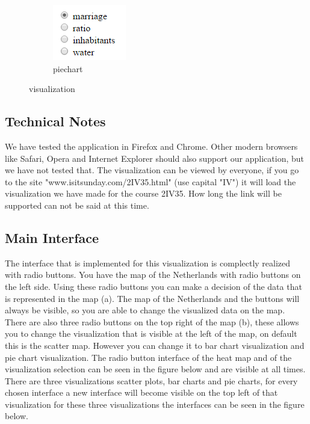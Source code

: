 \documentclass[a4paper,twoside,11pt]{article}
\begin{document}
\begin{figure}
\begin{subfigure}[h]{0.12\textwidth}
                \includegraphics[width=\textwidth]{Interface/PieInterface.png}
                \caption{piechart}
        \end{subfigure}
        \caption{visualization}
\end{figure}
\subsection{Technical Notes}
We have tested the application in Firefox and Chrome. Other modern browsers like Safari, Opera and Internet Explorer should also support our application, but we have not tested that. \newline
The visualization can be viewed by everyone, if you go to the site "www.isitsunday.com/2IV35.html" (use capital "IV") it will load the visualization we have made for the course 2IV35. How long the link will be supported can not be said at this time. \newline
\subsection{Main Interface}
The interface that is implemented for this visualization is complectly realized with radio buttons. You have the map of the Netherlands with radio buttons on the left side. Using these radio buttons you can make a decision of the data that is represented in the map (a). The map of the Netherlands and the buttons will always be visible, so you are able to change the visualized data on the map. There are also three radio buttons on the top right of the map (b), these allows you to change the visualization that is visible at the left of the map, on default this is the scatter map. However you can change it to bar chart visualization and pie chart visualization. \newline
The radio button interface of the heat map and of the visualization selection can be seen in the figure below and are visible at all times.\newline
There are three visualizations scatter plots, bar charts and pie charts, for every chosen interface a new interface will become visible on the top left of that visualization for these three visualizations the interfaces can be seen in the figure below. \newline
\end{document}

